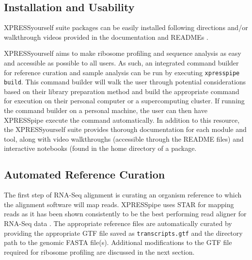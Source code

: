 \documentclass[10pt, oneside]{article}
\begin{document}
\begin{multicols}{2}
\subsection*{Installation and Usability}
XPRESSyourself suite packages can be easily installed following directions and/or walkthrough videos provided in the documentation and READMEs \cite{xpressyourself, xpresspipe_docs, xpressplot_docs}. \par

XPRESSyourself aims to make ribosome profiling and sequence analysis as easy and accessible as possible to all users. As such, an integrated command builder for reference curation and sample analysis can be run by executing \texttt{xpresspipe build}. This command builder will walk the user through potential considerations based on their library preparation method and build the appropriate command for execution on their personal computer or a supercomputing cluster. If running the command builder on a personal machine, the user can then have XPRESSpipe execute the command automatically. In addition to this resource, the XPRESSyourself suite provides thorough documentation for each module and tool, along with video walkthroughs (accessible through the README files) and interactive notebooks (found in the home directory of a package.

\subsection*{Automated Reference Curation}
The first step of RNA-Seq alignment is curating an organism reference to which the alignment software will map reads. XPRESSpipe uses STAR \cite{star} for mapping reads as it has been shown consistently to be the best performing read aligner for RNA-Seq data \cite{alignment_benchmark}. The appropriate reference files are automatically curated by providing the appropriate GTF file saved as \texttt{transcripts.gtf} and the directory path to the genomic FASTA file(s). Additional modifications to the GTF file required for ribosome profiling are discussed in the next section.



\end{multicols}
\end{document}

